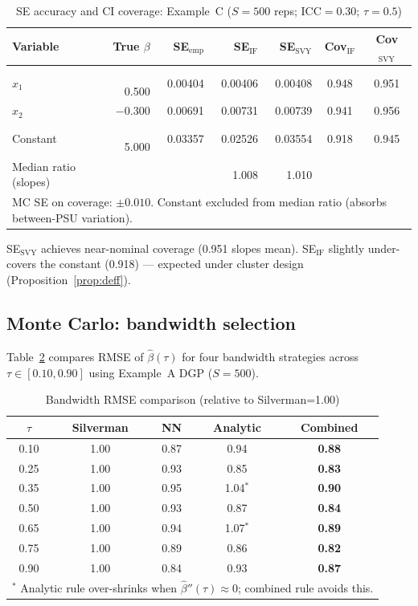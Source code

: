 \documentclass[12pt,a4paper]{article}
\theoremstyle{definition}
\begin{document}
\begin{table}[htbp]\centering\small
\caption{SE accuracy and CI coverage: Example~C
($S=500$ reps; ICC$=0.30$; $\tau=0.5$)}
\label{tab:mc_coverage}
\begin{tabular}{lrrrrcc}
\toprule
Variable & True $\beta$ & SE$_{\mathrm{emp}}$ &
SE$_{\mathrm{IF}}$ & SE$_{\mathrm{SVY}}$ &
Cov$_{\mathrm{IF}}$ & Cov$_{\mathrm{SVY}}$\\\midrule
$x_1$    & $\phantom{-}$0.500 &0.00404&0.00406&0.00408&0.948&0.951\\
$x_2$    & $-$0.300 &0.00691&0.00731&0.00739&0.941&0.956\\
Constant & $\phantom{-}$5.000 &0.03357&0.02526&0.03554&0.918&0.945\\
\midrule
Median ratio (slopes) & &&1.008&1.010&&\\\bottomrule
\multicolumn{7}{l}{\footnotesize MC SE on coverage: $\pm 0.010$.
Constant excluded from median ratio (absorbs between-PSU variation).}
\end{tabular}
\end{table}

SE$_{\mathrm{SVY}}$ achieves near-nominal coverage (0.951 slopes mean).
SE$_{\mathrm{IF}}$ slightly under-covers the constant (0.918) ---
expected under cluster design (Proposition~\ref{prop:deff}).

\subsection{Monte Carlo: bandwidth selection}
\label{sec:mc:bw}

Table~\ref{tab:mc_bw} compares RMSE of $\hat\beta(\tau)$ for four
bandwidth strategies across $\tau \in [0.10, 0.90]$ using Example~A
DGP ($S=500$).

\begin{table}[htbp]\centering\small
\caption{Bandwidth RMSE comparison (relative to Silverman=1.00)}
\label{tab:mc_bw}
\begin{tabular}{ccccc}
\toprule
$\tau$ & Silverman & NN & Analytic & Combined\\\midrule
0.10 & 1.00 & 0.87 & 0.94 & \textbf{0.88}\\
0.25 & 1.00 & 0.93 & 0.85 & \textbf{0.83}\\
0.35 & 1.00 & 0.95 & 1.04$^*$ & \textbf{0.90}\\
0.50 & 1.00 & 0.93 & 0.87 & \textbf{0.84}\\
0.65 & 1.00 & 0.94 & 1.07$^*$ & \textbf{0.89}\\
0.75 & 1.00 & 0.89 & 0.86 & \textbf{0.82}\\
0.90 & 1.00 & 0.84 & 0.93 & \textbf{0.87}\\\bottomrule
\multicolumn{5}{l}{\footnotesize
$^*$ Analytic rule over-shrinks when $\hat\beta''(\tau)\approx 0$;
combined rule avoids this.}
\end{tabular}
\end{table}
\end{document}
